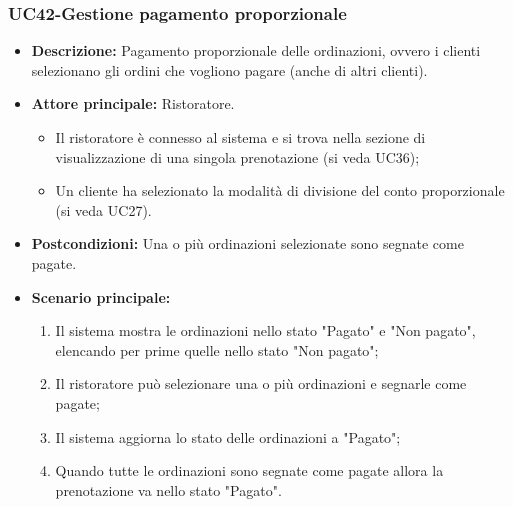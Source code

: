 \subsubsection{UC42-Gestione pagamento proporzionale}
\begin{itemize}
    \item \textbf{Descrizione:} Pagamento proporzionale delle ordinazioni, ovvero i clienti selezionano gli ordini che vogliono pagare (anche di altri clienti).
    \item \textbf{Attore principale:} Ristoratore.
    \begin{itemize}
        \item Il ristoratore è connesso al sistema e si trova nella sezione di visualizzazione di una singola prenotazione (si veda UC36);
        \item Un cliente ha selezionato la modalità di divisione del conto proporzionale (si veda UC27).
    \end{itemize}
    \item \textbf{Postcondizioni:} Una o più ordinazioni selezionate sono segnate come pagate.
    \item \textbf{Scenario principale:}
    \begin{enumerate}
        \item Il sistema mostra le ordinazioni nello stato "Pagato" e "Non pagato", elencando per prime quelle nello stato "Non pagato";
        \item Il ristoratore può selezionare una o più ordinazioni e segnarle come pagate;
        \item Il sistema aggiorna lo stato delle ordinazioni a "Pagato";
        \item Quando tutte le ordinazioni sono segnate come pagate allora la prenotazione va nello stato "Pagato".
    \end{enumerate}
\end{itemize}

